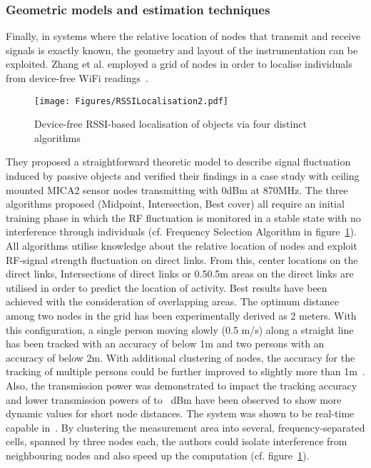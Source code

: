 \documentclass[journal]{IEEEtran}
\begin{document}
\begin{figure*}
\subsubsection{Geometric models and estimation techniques}
Finally, in systems where the relative location of nodes that transmit and receive signals is exactly known, the geometry and layout of the instrumentation can be exploited. 
Zhang et al. employed a grid of nodes in order to localise individuals from device-free WiFi readings~\cite{DeviceFreeRecognition_Zhang_2007}.
\begin{figure}
 \centering
 \texttt{[image: Figures/RSSILocalisation2.pdf]}
 \caption{Device-free RSSI-based localisation of objects via four distinct algorithms~\cite{DeviceFreeRecognition_Zhang_2007,RFSensing_Zhang_2011}}
 \label{figureRSSIBasedLocalisationAlgorithms}
\end{figure}
They proposed a straightforward theoretic model to describe signal fluctuation induced by passive objects and verified their findings in a case study with ceiling mounted MICA2 sensor nodes transmitting with 0dBm at 870MHz.
The three algorithms proposed (Midpoint, Intersection, Best cover) all require an initial training phase in which the RF fluctuation is monitored in a stable state with no interference through individuals (cf. Frequency Selection Algorithm in figure~\ref{figureRSSIBasedLocalisationAlgorithms}). 
All algorithms utilise knowledge about the relative location of nodes and exploit RF-signal strength fluctuation on direct links.
From this, center locations on the direct links, Intersections of direct links or 0.50.5m areas on the direct links are utilised in order to predict the location of activity. 
Best results have been achieved with the consideration of overlapping areas.
The optimum distance among two nodes in the grid has been experimentally derived as 2 meters.
With this configuration, a single person moving slowly (0.5 m/s) along a straight line has been tracked with an accuracy of below 1m and two persons with an accuracy of below 2m. 
With additional clustering of nodes, the accuracy for the tracking of multiple persons could be further improved to slightly more than 1m~\cite{RFSensing_Zhang_2009}.
Also, the transmission power was demonstrated to impact the tracking accuracy and lower transmission powers of  to ~dBm have been observed to show more dynamic values for short node distances.
The system was shown to be real-time capable in~\cite{RFSensing_Zhang_2011}.
By clustering the measurement area into several, frequency-separated cells, spanned by three nodes each, the authors could isolate interference from neighbouring nodes and also speed up the computation (cf. figure~\ref{figureRSSIBasedLocalisationAlgorithms}).


\end{figure*}
\end{document}
